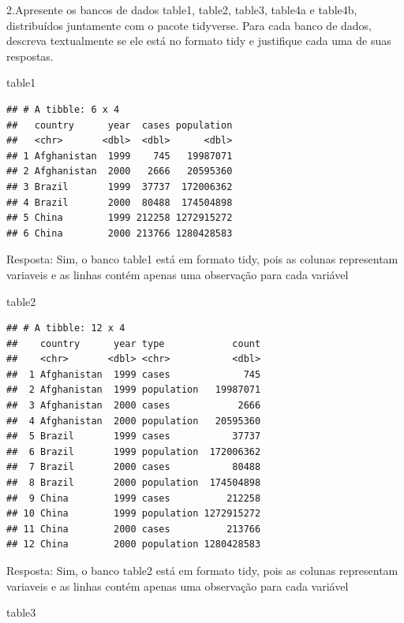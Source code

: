 \documentclass[
]{article}
\newenvironment{Shaded}{\begin{snugshade}}{\end{snugshade}}
\newcommand{\NormalTok}[1]{#1}
\begin{document}
2.Apresente os bancos de dados table1, table2, table3, table4a e
table4b, distribuídos juntamente com o pacote tidyverse. Para cada banco
de dados, descreva textualmente se ele está no formato tidy e justifique
cada uma de suas respostas.

\begin{Shaded}
\begin{Highlighting}[]
\NormalTok{table1}
\end{Highlighting}
\end{Shaded}

\begin{verbatim}
## # A tibble: 6 x 4
##   country      year  cases population
##   <chr>       <dbl>  <dbl>      <dbl>
## 1 Afghanistan  1999    745   19987071
## 2 Afghanistan  2000   2666   20595360
## 3 Brazil       1999  37737  172006362
## 4 Brazil       2000  80488  174504898
## 5 China        1999 212258 1272915272
## 6 China        2000 213766 1280428583
\end{verbatim}

Resposta: Sim, o banco table1 está em formato tidy, pois as colunas
representam variaveis e as linhas contém apenas uma observação para cada
variável

\begin{Shaded}
\begin{Highlighting}[]
\NormalTok{table2}
\end{Highlighting}
\end{Shaded}

\begin{verbatim}
## # A tibble: 12 x 4
##    country      year type            count
##    <chr>       <dbl> <chr>           <dbl>
##  1 Afghanistan  1999 cases             745
##  2 Afghanistan  1999 population   19987071
##  3 Afghanistan  2000 cases            2666
##  4 Afghanistan  2000 population   20595360
##  5 Brazil       1999 cases           37737
##  6 Brazil       1999 population  172006362
##  7 Brazil       2000 cases           80488
##  8 Brazil       2000 population  174504898
##  9 China        1999 cases          212258
## 10 China        1999 population 1272915272
## 11 China        2000 cases          213766
## 12 China        2000 population 1280428583
\end{verbatim}

Resposta: Sim, o banco table2 está em formato tidy, pois as colunas
representam variaveis e as linhas contém apenas uma observação para cada
variável

\begin{Shaded}
\begin{Highlighting}[]
\NormalTok{table3}
\end{Highlighting}
\end{Shaded}
\end{document}
